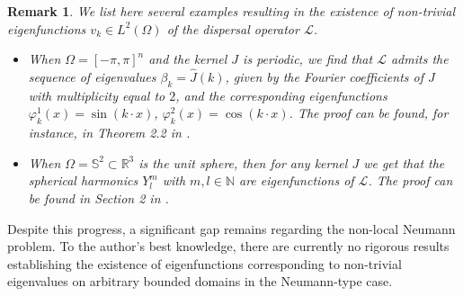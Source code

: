 \documentclass[11pt, a4paper]{article}
\providecommand{\MT}[1]{\todo[inline,author={MT},color=blue!20!white]{#1}}
\theoremstyle{break}
\theoremstyle{break}
\theoremstyle{break}
\theoremstyle{break}
\newtheorem{rem}{Remark}[section]
\theoremstyle{break}
\theoremstyle{break}
\theoremstyle{break}
\theoremstyle{break}
\theoremstyle{break}
\theoremstyle{break}
\begin{document}
\begin{rem}
    \label{rem:examples}
    We list here several examples resulting in the existence of non-trivial eigenfunctions $v_k \in L^2(\Omega)$ of the dispersal operator $\mathcal{L}$.
    \begin{itemize}
        \item When $\Omega = [-\pi, \pi]^n$ and the kernel $J$ is periodic, we find that $\mathcal{L}$ admits the sequence of eigenvalues $\beta_k = \hat{J}(k)$, given by the Fourier coefficients of $J$ with multiplicity equal to $2$, and the corresponding eigenfunctions $\varphi_k^1(x) = \sin(k\cdot x)$, $\varphi_k^2(x) = \cos(k\cdot x)$. The proof can be found, for instance, in Theorem 2.2 in \cite{Tadej2025}.
        \item When $\Omega = \mathbb{S}^2 \subset \mathbb{R}^3$ is the unit sphere, then for any kernel $J$ we get that the spherical harmonics $Y^m_l$ with $m, l \in \mathbb{N}$ are eigenfunctions of $\mathcal{L}$. The proof can be found in Section 2 in \cite{SlevinskyMontanelli2018}.
    \end{itemize}
\end{rem}

Despite this progress, a significant gap remains regarding the non-local Neumann problem. To the author's best knowledge, there are currently no rigorous results establishing the existence of eigenfunctions corresponding to non-trivial eigenvalues on arbitrary bounded domains in the Neumann-type case.



\end{document}
